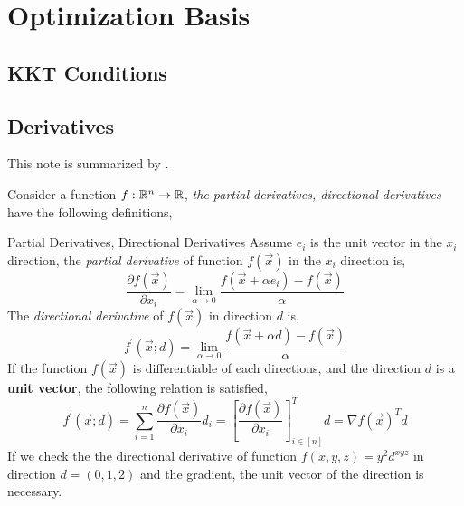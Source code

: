 \ifx\allfiles\undefined


	\else
	\fi
	\chapter{Optimization Basis}
	\section{KKT Conditions}

	\section{Derivatives}
	This note is summarized by \cite{directionalderivatievesandthegradientvector}.
	
	Consider a function $f:\mathbb{R}^n \rightarrow \mathbb{R}$,  \emph{the partial derivatives, directional derivatives} have the following definitions,
	\begin{defn}{Partial Derivatives, Directional Derivatives}{}
	Assume $e_i$ is the unit vector in the $x_i$ direction, the \emph{partial derivative} of function $f(\vec x)$ in the $x_i$ direction is,
	$$
	\frac{\partial f(\vec x)}{\partial x_i} = \lim_{\alpha\rightarrow 0}\frac{f(\vec x+\alpha e_i)-f(\vec x)}{\alpha}
	$$
	The \emph{directional derivative} of $f(\vec x)$ in direction $d$ is,
	$$
	f^{'}(\vec x;d) =  \lim_{\alpha\rightarrow 0}\frac{f(\vec x+\alpha d)-f(\vec x)}{\alpha}
	$$
	If the function $f(\vec x)$ is differentiable of each directions, and the direction $d$ is a \textbf{unit vector}, the following relation is satisfied,
	$$
	f^{'}(\vec x;d) = \sum_{i=1}^n \frac{\partial f(\vec x)}{\partial x_i} d_i = [\frac{\partial f(\vec x)}{\partial x_i}]_{i\in[n]}^Td=\nabla f(\vec x)^Td
	$$
	If we check the the directional derivative of function $f(x,y,z) = y^2d^{xyz}$ in direction $d=(0,1,2)$ and the gradient, the unit vector of the direction is necessary.
	\end{defn}
	
